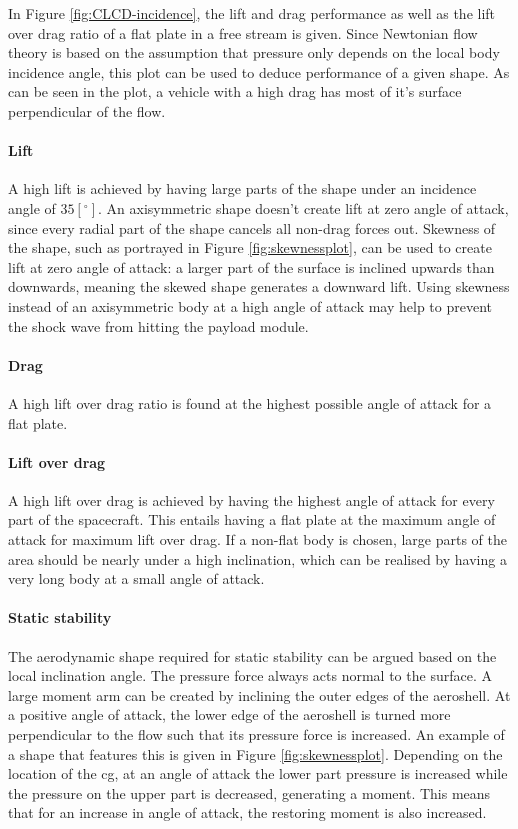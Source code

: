 In Figure \ref{fig:CLCD-incidence}, the lift and drag performance as well as the lift over drag ratio of a flat plate in a free stream is given. Since Newtonian flow theory is based on the assumption that pressure only depends on the local body incidence angle, this plot can be used to deduce performance of a given shape. As can be seen in the plot, a vehicle with a high drag has most of it's surface perpendicular of the flow.

\paragraph{Lift}
A high lift is achieved by having large parts of the shape under an incidence angle of $35 [^\circ]$. An axisymmetric shape doesn't create lift at zero angle of attack, since every radial part of the shape cancels all non-drag forces out. Skewness of the shape, such as portrayed in Figure \ref{fig:skewnessplot}, can be used to create lift at zero angle of attack: a larger part of the surface is inclined upwards than downwards, meaning the skewed shape generates a downward lift. Using skewness instead of an axisymmetric body at a high angle of attack may help to prevent the shock wave from hitting the payload module.

\paragraph{Drag}
A high lift over drag ratio is found at the highest possible angle of attack for a flat plate.

\paragraph{Lift over drag}
A high lift over drag is achieved by having the highest angle of attack for every part of the spacecraft. This entails having a flat plate at the maximum angle of attack for maximum lift over drag. If a non-flat body is chosen, large parts of the area should be nearly under a high inclination, which can be realised by having a very long body at a small angle of attack.

\paragraph{Static stability}
The aerodynamic shape required for static stability can be argued based on the local inclination angle. The pressure force always acts normal to the surface. A large moment arm can be created by inclining the outer edges of the aeroshell. At a positive angle of attack, the lower edge of the aeroshell is turned more perpendicular to the flow such that its pressure force is increased. An example of a shape that features this is given in Figure \ref{fig:skewnessplot}. Depending on the location of the \acrfull{cg}, at an angle of attack the lower part pressure is increased while the pressure on the upper part is decreased, generating a moment. This means that for an increase in angle of attack, the restoring moment is also increased.

